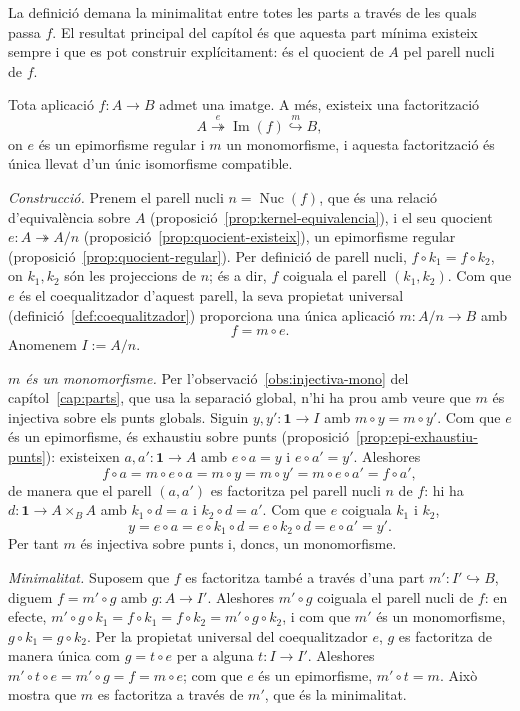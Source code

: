 La definició demana la minimalitat entre totes les parts a través de les
quals passa \(f\). El resultat principal del capítol és que aquesta part
mínima existeix sempre i que es pot construir explícitament: és el
quocient de \(A\) pel parell nucli de \(f\).

\begin{teorema}\label{teo:factoritzacio}
Tota aplicació \(f\colon A\to B\) admet una imatge. A més, existeix una
factorització
\[
A\overset{e}{\twoheadrightarrow}\operatorname{Im}(f)\overset{m}{\hookrightarrow}B,
\]
on \(e\) és un epimorfisme regular i \(m\) un monomorfisme, i aquesta
factorització és única llevat d'un únic isomorfisme compatible.
\end{teorema}

\begin{prova}
\emph{Construcció.} Prenem el parell nucli \(n=\operatorname{Nuc}(f)\),
que és una relació d'equivalència sobre \(A\)
(proposició~\ref{prop:kernel-equivalencia}), i el seu quocient
\(e\colon A\twoheadrightarrow A/n\)
(proposició~\ref{prop:quocient-existeix}), un epimorfisme regular
(proposició~\ref{prop:quocient-regular}). Per definició de parell nucli,
\(f\circ k_1=f\circ k_2\), on \(k_1,k_2\) són les projeccions de \(n\); és
a dir, \(f\) coiguala el parell \((k_1,k_2)\). Com que \(e\) és el
coequalitzador d'aquest parell, la seva propietat universal
(definició~\ref{def:coequalitzador}) proporciona una única aplicació
\(m\colon A/n\to B\) amb
\[
f=m\circ e.
\]
Anomenem \(I:=A/n\).

\emph{\(m\) és un monomorfisme.} Per l'observació~\ref{obs:injectiva-mono}
del capítol~\ref{cap:parts}, que usa la separació global, n'hi ha prou amb
veure que \(m\) és injectiva sobre els punts globals. Siguin
\(y,y'\colon\mathbf1\to I\) amb \(m\circ y=m\circ y'\). Com que \(e\) és un
epimorfisme, és exhaustiu sobre punts
(proposició~\ref{prop:epi-exhaustiu-punts}): existeixen
\(a,a'\colon\mathbf1\to A\) amb \(e\circ a=y\) i \(e\circ a'=y'\).
Aleshores
\[
f\circ a=m\circ e\circ a=m\circ y=m\circ y'=m\circ e\circ a'=f\circ a',
\]
de manera que el parell \((a,a')\) es factoritza pel parell nucli \(n\)
de \(f\): hi ha \(d\colon\mathbf1\to A\times_BA\) amb \(k_1\circ d=a\) i
\(k_2\circ d=a'\). Com que \(e\) coiguala \(k_1\) i \(k_2\),
\[
y=e\circ a=e\circ k_1\circ d=e\circ k_2\circ d=e\circ a'=y'.
\]
Per tant \(m\) és injectiva sobre punts i, doncs, un monomorfisme.

\emph{Minimalitat.} Suposem que \(f\) es factoritza també a través d'una
part \(m'\colon I'\hookrightarrow B\), diguem \(f=m'\circ g\) amb
\(g\colon A\to I'\). Aleshores \(m'\circ g\) coiguala el parell nucli de
\(f\): en efecte, \(m'\circ g\circ k_1=f\circ k_1=f\circ k_2=m'\circ
g\circ k_2\), i com que \(m'\) és un monomorfisme, \(g\circ k_1=g\circ
k_2\). Per la propietat universal del coequalitzador \(e\), \(g\) es
factoritza de manera única com \(g=t\circ e\) per a alguna
\(t\colon I\to I'\). Aleshores \(m'\circ t\circ e=m'\circ g=f=m\circ e\);
com que \(e\) és un epimorfisme, \(m'\circ t=m\). Això mostra que \(m\) es
factoritza a través de \(m'\), que és la minimalitat.


\end{prova}
